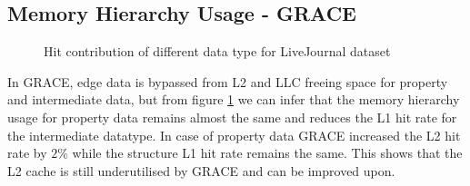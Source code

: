 \documentclass[a4paper,12pt, final]{report}
\begin{document}
\subsection{Memory Hierarchy Usage - GRACE}
\begin{figure}[!htb]
    \centering
    \qquad
    \caption{Hit contribution of different data type for LiveJournal dataset}%
    \label{fig:stacked_bar_grace}
\end{figure}

In GRACE, edge data is bypassed from L2 and LLC freeing space for property and intermediate data, but from
figure \ref{fig:stacked_bar_grace} we can infer that the memory hierarchy usage for property data remains almost the same and reduces the L1 hit rate for the intermediate datatype. In case of property data GRACE increased the L2 hit rate by $2\%$ while the structure L1 hit rate remains the same. This shows that the L2 cache is still underutilised by GRACE and can be improved upon.
\end{document}
